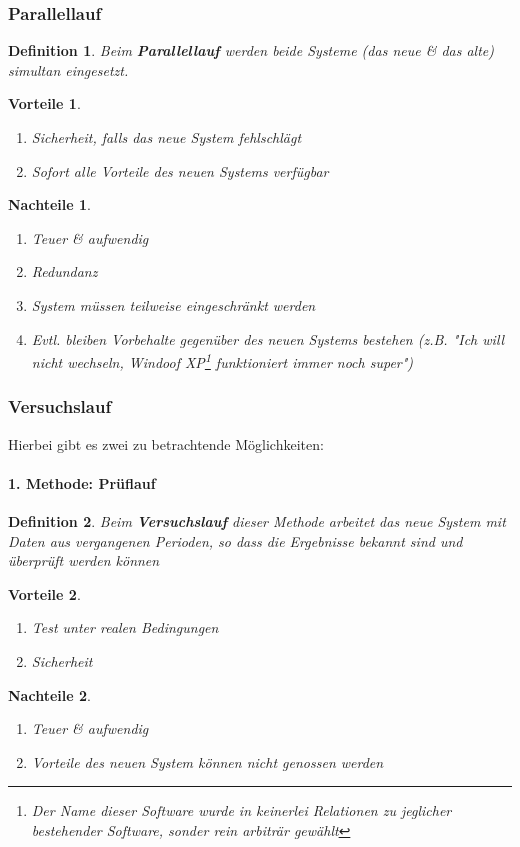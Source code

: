 \documentclass[a4paper]{article}
\theoremstyle{break}
\newtheorem{defi}{Definition}[section]
\newtheorem{why}{Vorteile}[section]
\newtheorem{whynot}{Nachteile}[section]
\begin{document}
\subsubsection{Parallellauf}
	\begin{defi}
		Beim \textbf{Parallellauf} werden beide Systeme (das neue \& das alte) simultan eingesetzt.
	\end{defi}
	\begin{why}
		\begin{enumerate}
			\item Sicherheit, falls das neue System fehlschlägt
			\item Sofort alle Vorteile des neuen Systems verfügbar
		\end{enumerate}
	\end{why}
	\begin{whynot}
		\begin{enumerate}
			\item Teuer \& aufwendig
			\item Redundanz
			\item System müssen teilweise eingeschränkt werden
			\item Evtl. bleiben Vorbehalte gegenüber des neuen Systems bestehen (z.B. "Ich will nicht wechseln, Windoof XP\footnote{Der Name dieser Software wurde in keinerlei Relationen zu jeglicher bestehender Software, sonder rein arbiträr gewählt} funktioniert immer noch super")
		\end{enumerate}
	\end{whynot}
\subsubsection{Versuchslauf}
\setcounter{secnumdepth}{4} %
Hierbei gibt es zwei zu betrachtende Möglichkeiten:
\paragraph{1. Methode: Prüflauf}
	\begin{defi}
		Beim \textbf{Versuchslauf} dieser Methode arbeitet das neue System mit Daten aus vergangenen Perioden, so dass die Ergebnisse bekannt sind und überprüft werden können
	\end{defi}
	\begin{why}
		\begin{enumerate}
			\item Test unter realen Bedingungen
			\item Sicherheit
		\end{enumerate}
	\end{why}
	\begin{whynot}
		\begin{enumerate}
			\item Teuer \& aufwendig
			\item Vorteile des neuen System können nicht genossen werden
		\end{enumerate}
	\end{whynot}
\end{document}
